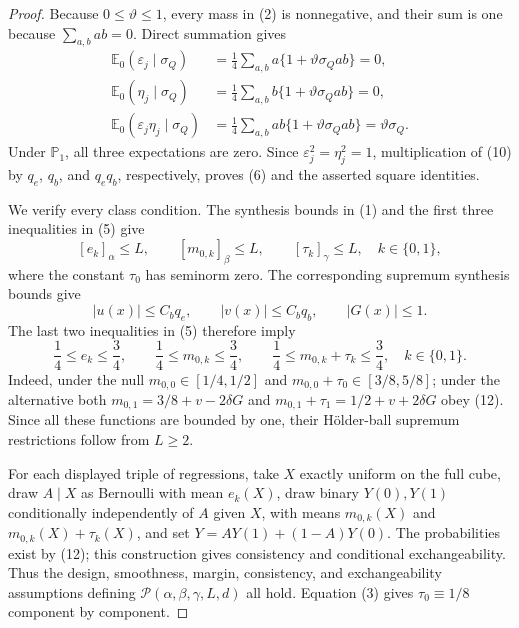 \documentclass{article}
\begin{document}
\begin{proof}
Because \(0\leq\vartheta\leq1\), every mass in (2) is nonnegative, and their sum is one because \(\sum_{a,b}ab=0\).  Direct summation gives
\[
 \begin{aligned}
 \mathbb E_0(\varepsilon_j\mid\sigma_Q)
 &=\frac14\sum_{a,b}a\{1+\vartheta\sigma_Qab\}=0,\\
 \mathbb E_0(\eta_j\mid\sigma_Q)
 &=\frac14\sum_{a,b}b\{1+\vartheta\sigma_Qab\}=0,\\
 \mathbb E_0(\varepsilon_j\eta_j\mid\sigma_Q)
 &=\frac14\sum_{a,b}ab\{1+\vartheta\sigma_Qab\}
 =\vartheta\sigma_Q.
 \end{aligned}
 \tag{10}
\]
Under \(\mathbb P_1\), all three expectations are zero.  Since \(\varepsilon_j^2=\eta_j^2=1\), multiplication of (10) by \(q_e\), \(q_b\), and \(q_eq_b\), respectively, proves (6) and the asserted square identities.

We verify every class condition.  The synthesis bounds in (1) and the first three inequalities in (5) give
\[
 [e_k]_{\alpha}\leq L,
 \qquad [m_{0,k}]_{\beta}\leq L,
 \qquad [\tau_k]_{\gamma}\leq L,
 \quad k\in\{0,1\},
\]
where the constant \(\tau_0\) has seminorm zero.  The corresponding supremum synthesis bounds give
\[
 |u(x)|\leq C_bq_e,
 \qquad |v(x)|\leq C_bq_b,
 \qquad |G(x)|\leq1.
 \tag{11}
\]
The last two inequalities in (5) therefore imply
\[
 \frac14\leq e_k\leq\frac34,
 \qquad
 \frac14\leq m_{0,k}\leq\frac34,
 \qquad
 \frac14\leq m_{0,k}+\tau_k\leq\frac34,
 \quad k\in\{0,1\}.
 \tag{12}
\]
Indeed, under the null \(m_{0,0}\in[1/4,1/2]\) and \(m_{0,0}+\tau_0\in[3/8,5/8]\); under the alternative both \(m_{0,1}=3/8+v-2\delta G\) and \(m_{0,1}+\tau_1=1/2+v+2\delta G\) obey (12).  Since all these functions are bounded by one, their Hölder-ball supremum restrictions follow from \(L\geq2\).

For each displayed triple of regressions, take \(X\) exactly uniform on the full cube, draw \(A\mid X\) as Bernoulli with mean \(e_k(X)\), draw binary \(Y(0),Y(1)\) conditionally independently of \(A\) given \(X\), with means \(m_{0,k}(X)\) and \(m_{0,k}(X)+\tau_k(X)\), and set \(Y=AY(1)+(1-A)Y(0)\).  The probabilities exist by (12); this construction gives consistency and conditional exchangeability.  Thus the design, smoothness, margin, consistency, and exchangeability assumptions defining \(\mathcal P(\alpha,\beta,\gamma,L,d)\) all hold.  Equation (3) gives \(\tau_0\equiv1/8\) component by component.


\end{proof}
\end{document}

